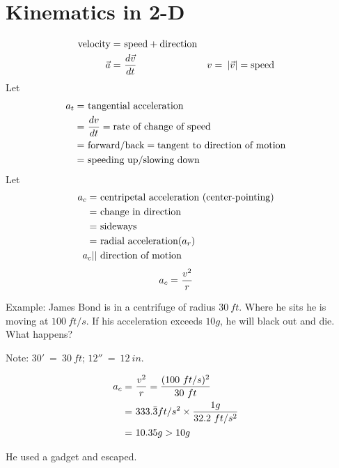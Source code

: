 \section{Kinematics in 2-D}
	\begin{align}
		\text{velocity} = \ &\text{speed} + \text{direction}& \notag \\
		\vec{a} = \ &\frac{d\vec{v}}{dt}& \notag
		v = \ &\left| \vec{v} \right| = \text{speed}& \notag
	\end{align}
	Let
	\begin{align}
		a_{t} = \ &\text{tangential acceleration}& \notag \\
		= \ &\frac{dv}{dt} = \text{rate of change of speed}& \notag \\
		= \ &\text{forward/back} = \text{tangent to direction of motion}& \notag \\
		= \ &\text{speeding up/slowing down}& \notag \\
	\end{align}
	Let
	\begin{align}
		a_{c} = \ &\text{centripetal acceleration (center-pointing)}& \notag \\
		= \ &\text{change in direction}& \notag \\
		= \ &\text{sideways}& \notag \\
		= \ &\text{radial acceleration} (a_{r})& \notag \\
		a_{c} || \ &\text{direction of motion}& \notag
	\end{align}
	\begin{align}
		a_{c} = \ &\frac{v^{2}}{r}& \notag \\
	\end{align}

	Example: James Bond is in a centrifuge of radius $30 \ ft$. Where he sits he is moving at $100 \ ft/s$. If his acceleration exceeds $10g$, he will black out and die. What happens?

	Note: $30' \ = \ 30 \ ft$; $12'' \ = \ 12 \ in.$

	\begin{align}
		a_{c} = \ &\frac{v^{2}}{r} = \frac{(100 \ ft/s)^{2}}{30 \ ft}& \notag \\
		= \ &333.\bar{3} ft/s^{2} \times \frac{1g}{32.2 \ ft/s^{2}}& \notag \\
		= \ &10.35g > 10g& \notag
	\end{align}

	He used a gadget and escaped.


